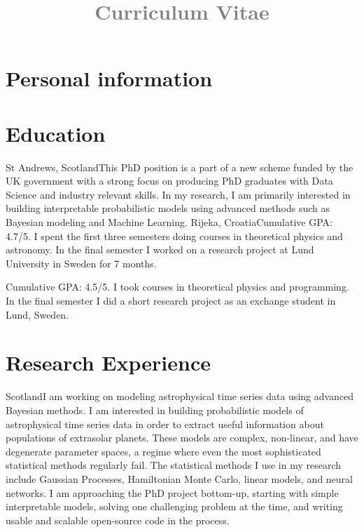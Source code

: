 \documentclass[11pt,a4paper,roman]{moderncv}
\title{\textcolor{gray}{ Curriculum Vitae}}
\begin{document}
\makecvtitle
\section{Personal information}

\section{Education}
{St Andrews, Scotland}{}{This PhD position is a part of a new scheme funded by the UK government
with a strong focus on producing PhD graduates with Data Science and industry relevant skills. 
In my research, I am primarily interested in building interpretable probabilistic models
using advanced methods such as Bayesian modeling and Machine Learning.}
{Rijeka, Croatia}{}{Cumulative GPA: 4.7/5. I spent the first three semesters 
doing courses in theoretical 
physics and astronomy. In the final semester I worked on 
a research project at Lund University in Sweden for 7 months.}

{Cumulative GPA: 4.5/5. I took courses in theoretical physics and programming. In the final 
semester I did a short research project as an exchange student in Lund, Sweden.}

\section{Research Experience}
{Scotland}{}{I am working on modeling astrophysical time series data 
using advanced Bayesian methods. 
I am interested in building
probabilistic models of astrophysical time series data
in order to extract useful information 
about populations of extrasolar planets.
These models are complex, non-linear, and have degenerate 
parameter spaces, a regime where
even the most sophisticated statistical methods regularly fail. 
The statistical methods I use in my research include 
Gaussian Processes, Hamiltonian Monte Carlo, linear models, 
and neural networks. I am approaching the PhD project 
bottom-up, starting with simple interpretable models, solving 
one challenging problem at the time, and writing usable 
and scalable open-source code in the process.} 
\end{document}
